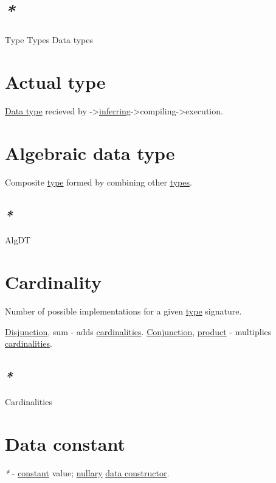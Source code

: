 \documentclass[a4paper,14pt,oneside]{book}
\begin{document}
\section{\emph{*}}
\label{sec:org814028e}

\label{org1eff537}Type
\label{orge9a3a14}Types
\label{orgb461148}Data types

\section{\label{org715112b}Actual type}
\label{sec:orgbd8b1b9}
\hyperref[org194580e]{Data type} recieved by ->\hyperref[org9afc164]{inferring}->compiling->execution.

\section{\label{orgef9f436}Algebraic data type}
\label{sec:org2b82084}
Composite \hyperref[org1eff537]{type} formed by combining other \hyperref[orge9a3a14]{types}.

\subsection{\emph{*}}
\label{sec:orgc8d098c}

\label{org25a2163}AlgDT

\section{\label{org8f55d81}Cardinality}
\label{sec:org19ff2ea}
Number of possible implementations for a given \hyperref[org1eff537]{type} signature.

\hyperref[orgd79d2fa]{Disjunction}, sum - adds \hyperref[org03a10fb]{cardinalities}.
\hyperref[org576f71f]{Conjunction}, \hyperref[org90a2f94]{product} - multiplies \hyperref[org03a10fb]{cardinalities}.

\subsection{\emph{*}}
\label{sec:orge06b07c}
\label{org03a10fb}Cardinalities

\section{\label{org7c63fa7}Data constant}
\label{sec:org1ed2a19}
\emph{*} - \hyperref[orgbe87fd2]{constant} value; \hyperref[org0155815]{nullary} \hyperref[org40b5390]{data constructor}.
\end{document}
